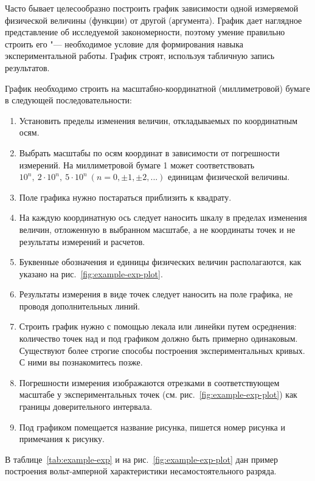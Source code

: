 \documentclass[a4paper, 12pt]{extarticle}
\begin{document}
Часто бывает целесообразно построить график зависимости одной измеряемой физической величины (функции) от другой (аргумента). График дает наглядное представление об исследуемой закономерности, поэтому умение правильно строить его "--- необходимое условие для формирования навыка экспериментальной работы. График строят, используя табличную запись результатов.

График необходимо строить на масштабно-координатной (миллиметровой) бумаге в следующей последовательности:

\begin{enumerate}
  \item Установить пределы изменения величин, откладываемых по координатным осям.
  \item  Выбрать масштабы по осям координат в зависимости от погрешности измерений. На миллиметровой бумаге 1  может соответствовать $10^n,\ 2\cdot10^n,\ 5\cdot10^n \ (n = 0, \pm 1, \pm 2, ...)$ единицам физической величины.
  \item Поле графика нужно постараться приблизить к квадрату.
  \item На каждую координатную ось следует наносить шкалу в пределах изменения величин, отложенную в выбранном масштабе, а не координаты точек и не результаты измерений и расчетов.
  \item Буквенные обозначения и единицы физических величин располагаются, как указано на рис.~\ref{fig:example-exp-plot}.
  \item Результаты измерения в виде точек следует наносить на поле графика, не проводя дополнительных линий.
  \item Строить график нужно с помощью лекала или линейки путем осреднения: количество точек над и под графиком должно быть примерно одинаковым. Существуют более строгие способы построения экспериментальных кривых. С ними вы познакомитесь позже.
  \item Погрешности измерения изображаются отрезками в соответствующем масштабе у экспериментальных точек (см. рис.~\ref{fig:example-exp-plot}) как границы доверительного интервала.
  \item Под графиком помещается название рисунка, пишется номер рисунка и примечания к рисунку.
\end{enumerate}

В таблице~\ref{tab:example-exp} и на рис.~\ref{fig:example-exp-plot} дан пример построения вольт-амперной характеристики несамостоятельного разряда.
\end{document}
